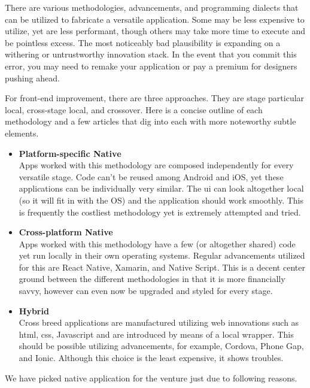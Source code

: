 There are various methodologies, advancements, and programming dialects that can be utilized to fabricate a versatile application. Some may be less expensive to utilize, yet are less performant, though others may take more time to execute and be pointless excess. The most noticeably bad plausibility is expanding on a withering or untrustworthy innovation stack. In the event that you commit this error, you may need to remake your application or pay a premium for designers pushing ahead.

For front-end improvement, there are three approaches. They are stage particular local, cross-stage local, and crossover. Here is a concise outline of each methodology and a few articles that dig into each with more noteworthy subtle elements.

\begin{itemize}
  \item \textbf{Platform-specific Native} \\
  Apps worked with this methodology are composed independently for every versatile stage. Code can't be reused among Android and iOS, yet these applications can be individually very similar. The \gls{ui} can look altogether local (so it will fit in with the OS) and the application should work smoothly. This is frequently the costliest methodology yet is extremely attempted and tried.
  
  \item \textbf{Cross-platform Native} \\ 
  Apps worked with this methodology have a few (or altogether shared) code yet run locally in their own operating systems. Regular advancements utilized for this are React Native, Xamarin, and Native Script. This is a decent center ground between the different methodologies in that it is more financially savvy, however can even now be upgraded and styled for every stage.
  
  \item \textbf{Hybrid} \\
 Cross breed applications are manufactured utilizing web innovations such as \gls{html}, \gls{css}, Javascript and are introduced by means of a local wrapper. This should be possible utilizing advancements, for example, Cordova, Phone Gap, and Ionic. Although this choice is the least expensive, it shows troubles.
\end{itemize}

We have picked native application for the venture just due to following reasons.

